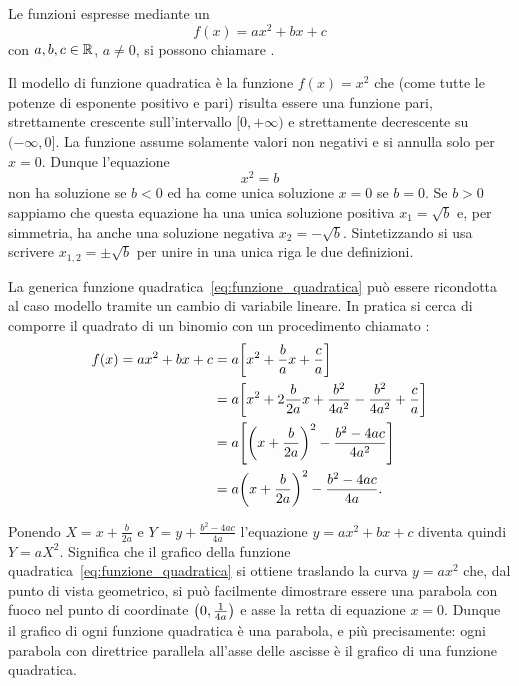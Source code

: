 Le funzioni espresse mediante un 
\begin{equation}\label{eq:funzione_quadratica}
  f(x) = ax^2 + bx +c
\end{equation}
con $a,b,c\in {\mathbb R}$, $a\neq 0$, si possono chiamare
.

Il modello di funzione quadratica è la funzione
$f(x) = x^2$ che (come tutte le potenze di esponente positivo e pari)
risulta essere una funzione pari, strettamente crescente
sull'intervallo $[0,+\infty)$ e strettamente decrescente
su $(-\infty,0]$. La funzione assume solamente valori non negativi
e si annulla solo per $x=0$.
Dunque l'equazione
\[
  x^2 = b
\]
non ha soluzione se $b<0$ ed ha come unica soluzione $x=0$ se $b=0$.
Se $b>0$ sappiamo che
questa equazione ha una unica soluzione positiva $x_1 = \sqrt{b}$
e, per simmetria, ha anche una soluzione negativa $x_2 = -\sqrt{b}$.
Sintetizzando si usa scrivere $x_{1,2} = \pm \sqrt{b}$
per unire in una unica riga le due definizioni.

La generica funzione quadratica~\eqref{eq:funzione_quadratica}
può essere ricondotta al caso modello tramite un cambio
di variabile lineare. In pratica si cerca di comporre il quadrato
di un binomio con un procedimento chiamato
:
\begin{equation}\label{eq:24589}
\begin{aligned}
f(x) = ax^2+bx+c
  &= a {\left[ x^2+\frac b a x + \frac c a \right]}\\
  &= a {\left[ x^2+2 \frac{b}{2a} x + \frac{b^2}{4a^2} - \frac{b^2}{4a^2} + \frac c a \right]}\\
  &= a {\left[ {\left( x+\frac{b}{2a} \right)}^2 - \frac{b^2-4ac}{4a^2} \right]} \\
  &= a{\left( x+\frac b{2a} \right)}^2  - \frac{b^2-4ac}{4a}.
\end{aligned}
\end{equation}

Ponendo $X=x+\frac b{2a}$ e $Y=y+\frac{b^2-4ac}{4a}$
l'equazione $y=ax^2+bx+c$ diventa quindi $Y=aX^2$. 
Significa
che il grafico della funzione quadratica~\eqref{eq:funzione_quadratica}
si ottiene traslando la curva $y = a x^2$ che, 
dal punto di vista geometrico, si può facilmente
dimostrare essere una parabola con fuoco
nel punto di coordinate ${\left( 0,\frac 1 {4a} \right)}$
e asse la retta di equazione $x=0$.
Dunque il grafico di ogni funzione quadratica è una parabola, 
e più precisamente: ogni parabola con direttrice parallela all'asse delle
ascisse è il grafico di una funzione quadratica.

